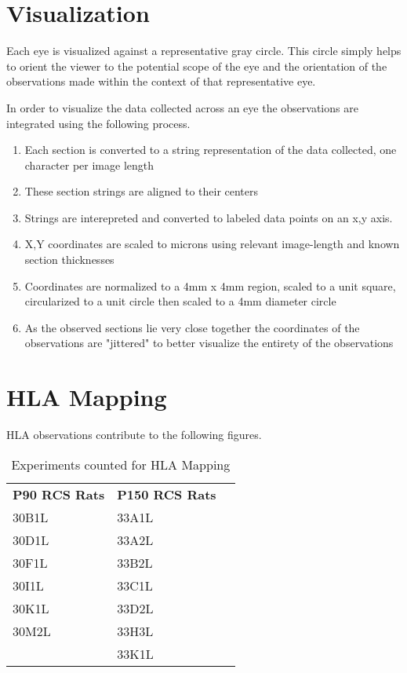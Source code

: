 \documentclass{article}
\begin{document}
\section{Visualization}
Each eye is visualized against a representative gray circle. This circle simply helps to orient the viewer to the potential scope of the eye and the orientation of the observations made within the context of that representative eye.

In order to visualize the data collected across an eye the observations are integrated using the following process. 

\begin{enumerate}
\item Each section is converted to a string representation of the data collected, one character per image length
\item These section strings are aligned to their centers
\item Strings are interepreted and converted to labeled data points on an x,y axis. 
\item X,Y coordinates are scaled to microns using relevant image-length and known section thicknesses
\item Coordinates are normalized to a 4mm x 4mm region, scaled to a unit square, circularized to a unit circle then scaled to a 4mm diameter circle
\item As the observed sections lie very close together the coordinates of the observations are "jittered" to better visualize the entirety of the observations
\end{enumerate}

\clearpage
\section{HLA Mapping}
HLA observations contribute to the following figures. 
\begin{table}[]
\centering
\begin{tabular}{lll}
 \textbf{P90 RCS Rats} & \textbf{P150 RCS Rats} \\
30B1L & 33A1L \\
30D1L & 33A2L \\
30F1L & 33B2L \\
30I1L & 33C1L \\
30K1L & 33D2L \\
30M2L & 33H3L \\
 & 33K1L \\
\end{tabular}
\caption{Experiments counted for HLA Mapping}
\end{table}
\end{document}
